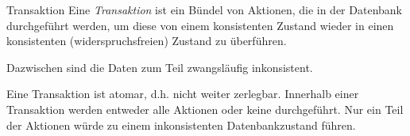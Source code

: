 \begin{defi}{Transaktion}
    Eine \emph{Transaktion} ist ein Bündel von Aktionen, die in der Datenbank durchgeführt werden, um diese von einem konsistenten Zustand wieder in einen konsistenten (widerspruchsfreien) Zustand zu überführen.

    Dazwischen sind die Daten zum Teil zwangsläufig inkonsistent.

    Eine Transaktion ist atomar, d.h. nicht weiter zerlegbar.
    Innerhalb einer Transaktion werden entweder alle Aktionen oder keine durchgeführt.
    Nur ein Teil der Aktionen würde zu einem inkonsistenten Datenbankzustand führen.
\end{defi}